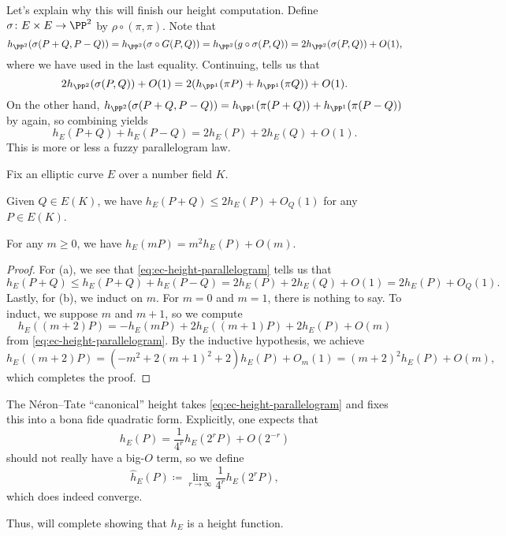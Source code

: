 \documentclass[../notes.tex]{subfiles}
\begin{document}
Let's explain why this will finish our height computation. Define $\sigma\colon E\times E\to\PP^2$ by $\rho\circ(\pi,\pi)$. Note that
\[h_{\PP^2}(\sigma(P+Q,P-Q))=h_{\PP^2}(\sigma\circ G(P,Q))=h_{\PP^2}(g\circ\sigma(P,Q))=2h_{\PP^2}(\sigma(P,Q))+O(1),\]
where we have used  in the last equality. Continuing,  tells us that
\[2h_{\PP^2}(\sigma(P,Q))+O(1)=2(h_{\PP^1}(\pi P)+h_{\PP^1}(\pi Q))+O(1).\]
On the other hand, $h_{\PP^2}(\sigma(P+Q,P-Q))=h_{\PP^1}(\pi(P+Q))+h_{\PP^1}(\pi(P-Q))$ by  again, so combining yields
\begin{equation}
	h_E(P+Q)+h_E(P-Q)=2h_E(P)+2h_E(Q)+O(1). \label{eq:ec-height-parallelogram}
\end{equation}
This is more or less a fuzzy parallelogram law.
\begin{corollary} \label{cor:finishing-height}
	Fix an elliptic curve $E$ over a number field $K$.
	\begin{listalph}
		\item Given $Q\in E(K)$, we have $h_E(P+Q)\le 2h_E(P)+O_Q(1)$ for any $P\in E(K)$.
		\item For any $m\ge0$, we have $h_E(mP)=m^2h_E(P)+O(m)$.
	\end{listalph}
\end{corollary}
\begin{proof}
	For (a), we see that \eqref{eq:ec-height-parallelogram} tells us that
	\[h_E(P+Q)\le h_E(P+Q)+h_E(P-Q)=2h_E(P)+2h_E(Q)+O(1)=2h_E(P)+O_Q(1).\]
	Lastly, for (b), we induct on $m$. For $m=0$ and $m=1$, there is nothing to say. To induct, we suppose $m$ and $m+1$, so we compute
	\[h_E((m+2)P)=-h_E(mP)+2h_E((m+1)P)+2h_E(P)+O(m)\]
	from \eqref{eq:ec-height-parallelogram}. By the inductive hypothesis, we achieve
	\[h_E((m+2)P)=\left(-m^2+2(m+1)^2+2\right)h_E(P)+O_m(1)=(m+2)^2h_E(P)+O(m),\]
	which completes the proof.
\end{proof}
\begin{remark}
	The N\'eron--Tate ``canonical'' height takes \eqref{eq:ec-height-parallelogram} and fixes this into a bona fide quadratic form. Explicitly, one expects that
	\[h_E(P)=\frac1{4^r}h_E\left(2^rP\right)+O\left(2^{-r}\right)\]
	should not really have a big-$O$ term, so we define
	\[\hat h_E(P)\coloneqq\lim_{r\to\infty}\frac1{4^r}h_E\left(2^rP\right),\]
	which does indeed converge.
\end{remark}
Thus,  will complete showing that $h_E$ is a height function.
\end{document}
